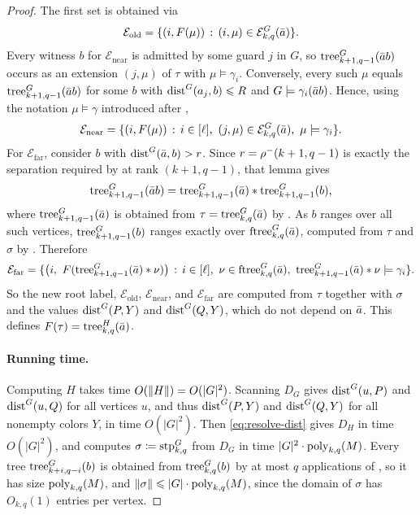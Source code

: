 \begin{proof}
The first set is obtained via
\[
\mathcal E_{\mathrm{old}}
=
\{(i,F(\mu)) \,:\, (i,\mu)\in\mathcal E^G_{k,q}(\bar a) \}.
\]
Every witness $b$ for $\mathcal E_{\mathrm{near}}$ is admitted by some guard $j$ in $G$, so $\mathrm{tree}^G_{k+1,q-1}(\bar a b)$ occurs as an extension $(j,\mu)$ of $\tau$ with $\mu\models\gamma_i$.
Conversely, every such $\mu$ equals $\mathrm{tree}^G_{k+1,q-1}(\bar a b)$ for some $b$ with $\mathrm{dist}^G(a_j,b)\leqslant R$ and $G\models\gamma_i(\bar a b)$.
Hence, using the notation $\mu\models\gamma$ introduced after ,
\[
\mathcal E_{\mathrm{near}}
=
\setof{(i,F(\mu))}{i\in[\ell],\ (j,\mu)\in\mathcal E^G_{k,q}(\tup a),\ \mu\models\gamma_i}.
\]
For $\mathcal E_{\mathrm{far}}$, consider $b$ with $\mathrm{dist}^G(\bar a,b)>r$.
Since $r=\rho^-(k+1,q-1)$ is exactly the separation required by  at rank $(k+1,q-1)$, that lemma %
gives
\[
\mathrm{tree}^G_{k+1,q-1}(\bar a b)
=
\mathrm{tree}^G_{k+1,q-1}(\bar a)\ast\mathrm{tree}^G_{k+1,q-1}(b),
\]
where $\mathrm{tree}^G_{k+1,q-1}(\bar a)$ is obtained from $\tau=\mathrm{tree}^G_{k,q}(\bar a)$ by .
As $b$ ranges over all such vertices, $\mathrm{tree}^G_{k+1,q-1}(b)$ ranges exactly over $\textnormal{ftree}^G_{k,q}(\bar a)$, computed from $\tau$ and $\sigma$ by .
Therefore
\[
\mathcal E_{\mathrm{far}}
=
\setof{\bigl(i,\ F(\tree^G_{k+1,q-1}(\tup a)\ast\nu)\bigr)}{i\in[\ell],\ \nu\in\ftree^G_{k,q}(\tup a),\ \tree^G_{k+1,q-1}(\tup a)\ast\nu\models\gamma_i}.
\]
So the new root label, $\mathcal E_{\mathrm{old}}$, $\mathcal E_{\mathrm{near}}$, and $\mathcal E_{\mathrm{far}}$ are computed from $\tau$ together with $\sigma$ and the values $\mathrm{dist}^G(P,Y)$ and $\mathrm{dist}^G(Q,Y)$, which do not depend on $\bar a$. This defines $F(\tau)=\mathrm{tree}^{H}_{k,q}(\bar a)$.

\paragraph{Running time.}
Computing $H$ takes time $O(\lVert H\rVert)=O(|G|^2)$.
Scanning $D_G$ gives $\mathrm{dist}^G(u,P)$ and $\mathrm{dist}^G(u,Q)$ for all vertices $u$, and thus $\mathrm{dist}^G(P,Y)$ and $\mathrm{dist}^G(Q,Y)$ for all nonempty colors $Y$, in time $O(|G|^2)$.
Then \eqref{eq:resolve-dist} gives $D_H$ in time $O(|G|^2)$, and  computes $\sigma\coloneqq\textnormal{stp}^G_{k,q}$ from $D_G$ in time $|G|^2\cdot\mathrm{poly}_{k,q}(M)$.
Every tree $\mathrm{tree}^G_{k+i,q-i}(b)$ is obtained from $\mathrm{tree}^G_{k,q}(b)$ by at most $q$ applications of , so it has size $\mathrm{poly}_{k,q}(M)$, and $\lVert \sigma\rVert\leqslant |G|\cdot\mathrm{poly}_{k,q}(M)$, since the domain of $\sigma$ has $O_{k,q}(1)$ entries per vertex.


\end{proof}
